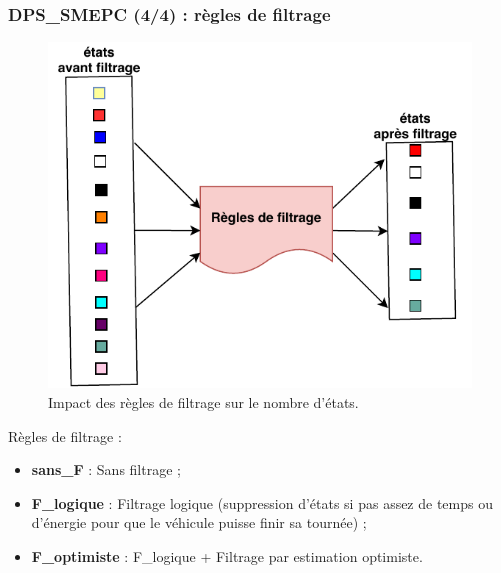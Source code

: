 \documentclass[hyperref={bookmarks=false},aspectratio=169]{beamer}
\begin{document}
\begin{frame}
	\frametitle{DPS\_SMEPC (4/4) : règles de filtrage}


\begin{minipage}{.5\textwidth}%

\begin{figure}
    \centering
   \includegraphics[width=\textwidth]{./figures/Filtrage(1).pdf}
    \caption{Impact des règles de filtrage sur le nombre d'états.}
    \label{fig:my_label}
\end{figure}

\end{minipage}%
\hfill
\begin{minipage}{.5\textwidth}%

 Règles de filtrage :
 \begin{itemize}

\item \textbf{sans\_F} : Sans filtrage ;%

\item \textbf{F\_logique} : Filtrage logique (suppression d'états si pas assez de temps ou d’énergie pour que le véhicule puisse finir sa
tournée) ;%

\item \textbf{F\_optimiste} : F\_logique + Filtrage par estimation optimiste.%
 \end{itemize}
 
 
\end{minipage}%

\end{frame}
\end{document}
